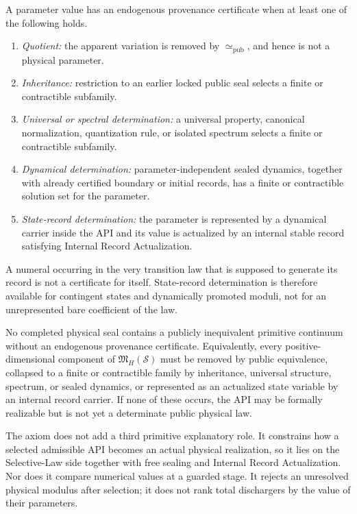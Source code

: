 \begin{definition}
A parameter value has an endogenous provenance certificate when at least one of the
following holds.
\begin{enumerate}[label=\textup{P\arabic*},leftmargin=2.4em]
\item \emph{Quotient:} the apparent variation is removed by
      \(\simeq_{\mathrm{pub}}\), and hence is not a physical parameter.
\item \emph{Inheritance:} restriction to an earlier locked public seal selects a
      finite or contractible subfamily.
\item \emph{Universal or spectral determination:} a universal property, canonical
      normalization, quantization rule, or isolated spectrum selects a finite or
      contractible subfamily.
\item \emph{Dynamical determination:} parameter-independent sealed dynamics,
      together with already certified boundary or initial records, has a finite or
      contractible solution set for the parameter.
\item \emph{State-record determination:} the parameter is represented by a
      dynamical carrier inside the API and its value is actualized by an internal
      stable record satisfying Internal Record Actualization.
\end{enumerate}
A numeral occurring in the very transition law that is supposed to generate its
record is not a certificate for itself.  State-record determination is therefore
available for contingent states and dynamically promoted moduli, not for an
unrepresented bare coefficient of the law.
\end{definition}

\begin{axiom}
\label{ax:parameter-provenance}
No completed physical seal contains a publicly inequivalent primitive continuum
without an endogenous provenance certificate.  Equivalently, every
positive-dimensional component of \(\mathfrak M_H(\mathcal S)\) must be removed by
public equivalence, collapsed to a finite or contractible family by inheritance,
universal structure, spectrum, or sealed dynamics, or represented as an actualized
state variable by an internal record carrier.  If none of these occurs, the API may
be formally realizable but is not yet a determinate public physical law.
\end{axiom}

\begin{remark}
The axiom does not add a third primitive explanatory role.  It constrains how a
selected admissible API becomes an actual physical realization, so it lies on the
Selective-Law side together with free sealing and Internal Record Actualization.
Nor does it compare numerical values at a guarded stage.  It rejects an unresolved
physical modulus after selection; it does not rank total dischargers by the value of
their parameters.
\end{remark}

